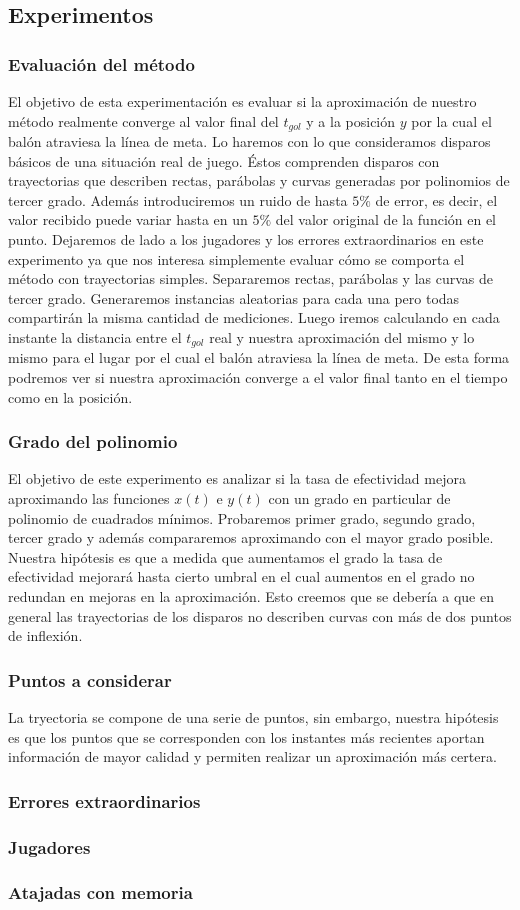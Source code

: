 \subsection{Experimentos}

\subsubsection{Evaluación del método}
El objetivo de esta experimentación es evaluar si la aproximación de nuestro método realmente converge al valor final del $t_{gol}$ y a 
la posición $y$ por la cual el balón atraviesa la línea de meta. Lo haremos con lo que consideramos disparos básicos de una situación
real de juego. Éstos comprenden disparos con trayectorias que describen rectas, parábolas y curvas generadas por polinomios de tercer
grado. Además introduciremos un ruido de hasta $5\%$ de error, es decir, el valor recibido puede variar hasta en un $5\%$ del valor
original de la función en el punto. Dejaremos de lado a los jugadores y los errores extraordinarios en este experimento ya que nos interesa
simplemente evaluar cómo se comporta el método con trayectorias simples.
Separaremos rectas, parábolas y las curvas de tercer grado. Generaremos instancias aleatorias para cada una pero todas compartirán la misma
cantidad de mediciones. Luego iremos calculando en cada instante la distancia entre el $t_{gol}$ real y nuestra aproximación del mismo y lo
mismo para el lugar por el cual el balón atraviesa la línea de meta. De esta forma podremos ver si nuestra aproximación converge a el
valor final tanto en el tiempo como en la posición.

\subsubsection{Grado del polinomio}
El objetivo de este experimento es analizar si la tasa de efectividad mejora aproximando las funciones $x(t)$ e $y(t)$ con un grado en 
particular de polinomio de cuadrados mínimos. Probaremos primer grado, segundo grado, tercer grado y además compararemos aproximando
con el mayor grado posible. Nuestra hipótesis es que a medida que aumentamos el grado la tasa de efectividad mejorará hasta cierto umbral en 
el cual aumentos en el grado no redundan en mejoras en la aproximación. Esto creemos que se debería a que en general las trayectorias de los 
disparos no describen curvas con más de dos puntos de inflexión.

\subsubsection{Puntos a considerar}
La tryectoria se compone de una serie de puntos, sin embargo, nuestra hipótesis es que los puntos que se corresponden con los instantes más
recientes aportan información de mayor calidad y permiten realizar un aproximación más certera.


\subsubsection{Errores extraordinarios}


\subsubsection{Jugadores}

\subsubsection{Atajadas con memoria}
